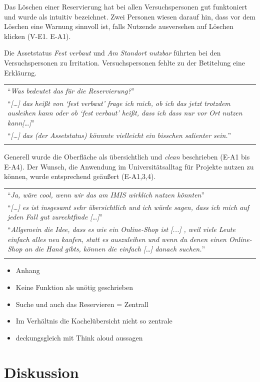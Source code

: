 Das Löschen einer Reservierung hat bei allen Versuchspersonen gut funktoniert
und wurde als intuitiv bezeichnet. Zwei Personen wiesen darauf hin, dass vor dem
Löschen eine Warnung sinnvoll ist, falls Nutzende ausversehen auf Löschen
klicken (V-E1. E-A1).

Die Assetstatus \textit{Fest verbaut} und \textit{Am Standort nutzbar} führten
bei den Versuchspersonen zu Irritation. Versuchspersonen fehlte zu der Betitelung
eine Erkläurng.

\begin{longtable}{p{}} \arrayrulecolor{maincolor}\hline
  \enquote{\textit{Was bedeutet das für die Reservierung?}} \\
  \enquote{\textit{[\dots] das heißt von \enquote{fest verbaut} frage ich mich,
      ob ich das jetzt trotzdem ausleihen kann oder ob \enquote{fest verbaut} heißt,
  dass ich dass nur vor Ort nutzen kann[\dots]}}            \\
  \enquote{\textit{[\dots] das (der Assetstatus) könnnte vielleicht ein bisschen
  salienter sein.}}                                         \\
  \arrayrulecolor{maincolor}\hline
\end{longtable}

Generell wurde die Oberfläche als übersichtlich und \textit{clean} beschrieben
(E-A1 bis E-A4). Der Wunsch, die Anwendung im Universitätsalltag für Projekte
nutzen zu können, wurde entsprechend geäußert (E-A1,3,4).

\begin{longtable}{p{}} \arrayrulecolor{maincolor}\hline
  \enquote{\textit{Ja, wäre cool, wenn wir das am IMIS wirklich nutzen
  könnten}}                                                      \\
  \enquote{\textit{[\dots] es ist insgesamt sehr übersichtlich und ich würde
  sagen, dass ich mich auf jeden Fall gut zurechtfinde [\dots]}} \\
  \enquote{\textit{Allgemein die Idee, dass es wie ein Online-Shop ist [...] ,
      weil viele Leute einfach alles neu kaufen, statt es auszuleihen und wenn du
      denen einen Online-Shop an die Hand gibts, können die einfach [\dots] danach
  suchen.}}                                                      \\
  \arrayrulecolor{maincolor}\hline
\end{longtable}


\begin{itemize}
  \item Anhang
  \item Keine Funktion als unötig geschrieben
  \item Suche und auch das Reservieren = Zentrall
  \item Im Verhältnis die Kachelübersicht nicht so zentrale
  \item deckungsgleich mit Think aloud aussagen
\end{itemize}


\section{Diskussion}
